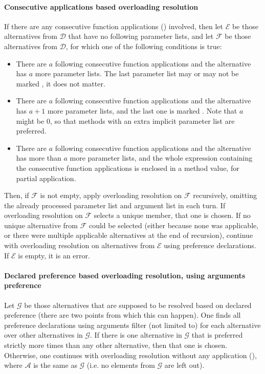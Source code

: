 \paragraph{Consecutive applications based overloading resolution}
If there are any consecutive function applications () involved, then let $\mathcal{E}$ be those alternatives from $\mathcal{D}$ that have no following parameter lists, and let $\mathcal{F}$ be those alternatives from $\mathcal{D}$, for which one of the following conditions is true:
\begin{itemize}
  \item There are $a$ following consecutive function applications and the alternative has $a$ more parameter lists. The last parameter list may or may not be marked , it does not matter. 
  \item There are $a$ following consecutive function applications and the alternative has $a + 1$ more parameter lists, and the last one is marked . Note that $a$ might be 0, so that methods with an extra implicit parameter list are preferred. 
  \item There are $a$ following consecutive function applications and the alternative has more than $a$ more parameter lists, and the whole expression containing the consecutive function applications is enclosed in a method value, for partial application. 
\end{itemize}
Then, if $\mathcal{F}$ is not empty, apply overloading resolution on $\mathcal{F}$ recursively, omitting the already processed parameter list and argument list in each turn. If overloading resolution on $\mathcal{F}$ selects a unique member, that one is chosen. If no unique alternative from $\mathcal{F}$ could be selected (either because none was applicable, or there were multiple applicable alternatives at the end of recursion), continue with overloading resolution on alternatives from $\mathcal{E}$ using preference declarations. If $\mathcal{E}$ is empty, it is an error. 

\paragraph{Declared preference based overloading resolution, using arguments preference}
Let $\mathcal{G}$ be those alternatives that are supposed to be resolved based on declared preference (there are two points from which this can happen). One finds all preference declarations using arguments filter (not limited to) for each alternative over other alternatives in $\mathcal{G}$. If there is one alternative in $\mathcal{G}$ that is preferred strictly more times than any other alternative, then that one is chosen. Otherwise, one continues with overloading resolution without any application (), where $\mathcal{A}$ is the same as $\mathcal{G}$ (i.e. no elements from $\mathcal{G}$ are left out). 

